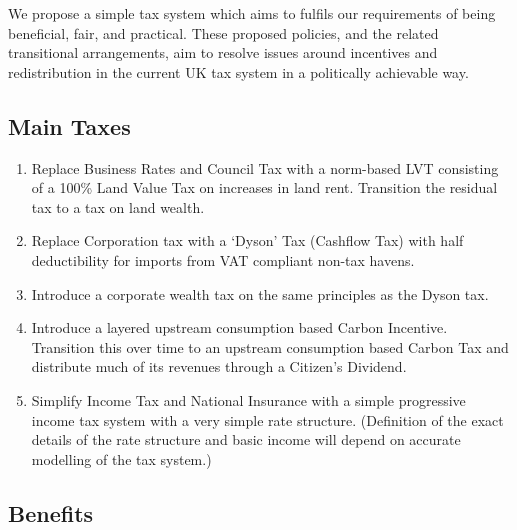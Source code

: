 \documentclass[]{tufte-handout}
\providecommand{\tightlist}{%
  \setlength{\itemsep}{0pt}\setlength{\parskip}{0pt}}
\begin{document}
We propose a simple tax system which aims to fulfils our requirements of
being beneficial, fair, and practical. These proposed policies, and the
related transitional arrangements, aim to resolve issues around
incentives and redistribution in the current UK tax system in a
politically achievable way.

\hypertarget{main-taxes}{%
\subsection{Main Taxes}\label{main-taxes}}

\begin{enumerate}
\def\labelenumi{\arabic{enumi}.}
\tightlist
\item
  Replace Business Rates and Council Tax with a norm-based LVT
  consisting of a 100\% Land Value Tax on increases in land rent.
  Transition the residual tax to a tax on land wealth.
\item
  Replace Corporation tax with a `Dyson' Tax (Cashflow Tax) with half
  deductibility for imports from VAT compliant non-tax havens.\\
\item
  Introduce a corporate wealth tax on the same principles as the Dyson
  tax.
\item
  Introduce a layered upstream consumption based Carbon Incentive.
  Transition this over time to an upstream consumption based Carbon Tax
  and distribute much of its revenues through a Citizen's Dividend.
\item
  Simplify Income Tax and National Insurance with a simple progressive
  income tax system with a very simple rate structure. (Definition of
  the exact details of the rate structure and basic income will depend
  on accurate modelling of the tax system.)
\end{enumerate}

\hypertarget{benefits}{%
\subsection{Benefits}\label{benefits}}
\end{document}
